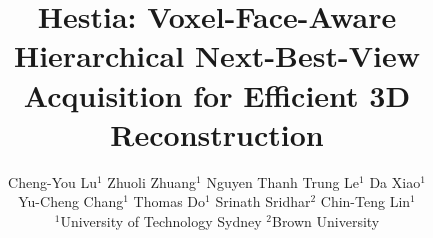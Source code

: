 \documentclass[10pt,twocolumn,letterpaper]{article}
\title{Hestia: Voxel-Face-Aware Hierarchical Next-Best-View Acquisition for Efficient 3D Reconstruction}
\author{
Cheng-You Lu$^{1}$ \qquad
Zhuoli Zhuang$^{1}$ \qquad
Nguyen Thanh Trung Le$^{1}$ \qquad
Da Xiao$^{1}$ \\
Yu-Cheng Chang$^{1}$ \qquad
Thomas Do$^{1}$ \qquad
Srinath Sridhar$^{2}$ \qquad
Chin-Teng Lin$^{1}$ \\
$^{1}$University of Technology Sydney \qquad
$^{2}$Brown University\\
}
\begin{document}
\maketitle
    

    



{
    \small
    
    
}
\clearpage

\end{document}
